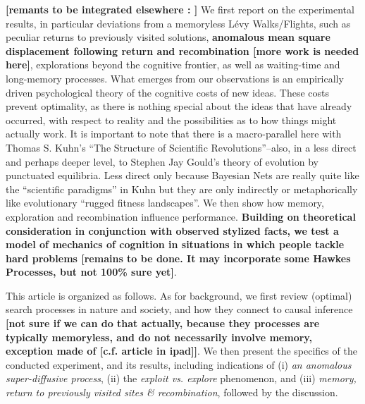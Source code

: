 {\bf [remants to be integrated elsewhere : ]} We first report on the experimental results, in particular deviations from a memoryless L\'evy Walks/Flights, such as peculiar returns to previously visited solutions, {\bf anomalous mean square displacement following return and recombination [more work is needed here]}, explorations beyond the cognitive frontier, as well as waiting-time and long-memory processes. What emerges from our observations is an empirically driven psychological theory of the cognitive costs of new ideas. These costs prevent optimality, as there is nothing special about the ideas that have already occurred, with respect to reality and the possibilities as to how things might actually work. It is important to note that there is a macro-parallel here with Thomas S. Kuhn's ``The Structure of Scientific Revolutions''--also, in a less direct and perhaps deeper level, to Stephen Jay Gould's theory of evolution by punctuated equilibria. Less direct only because Bayesian Nets are really quite like the ``scientific paradigms'' in Kuhn but they are only indirectly or metaphorically like evolutionary ``rugged fitness landscapes''. We then show how memory, exploration and recombination influence performance. {\bf Building on theoretical consideration in conjunction with observed stylized facts, we test a model of mechanics of cognition in situations in which people tackle hard problems [remains to be done. It may incorporate some Hawkes Processes, but not 100\% sure yet]}. 

This article is organized as follows. As for background, we first review (optimal) search processes in nature and society, and how they connect to causal inference {\bf [not sure if we can do that actually, because they processes are typically memoryless, and do not necessarily involve memory, exception made of [c.f. article in ipad]]}. We then present the specifics of the conducted experiment, and its results, including indications of (i) {\it an anomalous super-diffusive process},  (ii) the {\it exploit vs. explore} phenomenon, and (iii) {\it memory, return to previously visited sites \& recombination}, followed by the discussion. 





